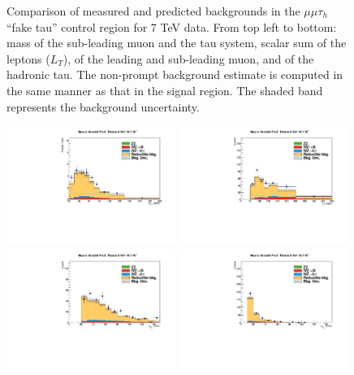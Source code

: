 \begin{figure}
\begin{center}
  \caption{Comparison of measured and predicted backgrounds in the $\mu\mu\tau_h$ ``fake tau'' control region for 7 TeV data.
  From top left to bottom: mass of the sub-leading muon and the tau system, scalar sum of the leptons \pT ($L_T$), \pT of the leading and sub-leading muon, and \pT of the hadronic tau.
  The non-prompt background estimate is computed in the same manner as that in the signal region.
  The shaded band represents the background uncertainty.
  }
  \label{fig:LLT_mmt_f3_control_7TeV}
\end{center}
\end{figure}

\begin{figure}
\begin{center}
  \includegraphics[width=0.49\textwidth]{4_Analisys/pics/8TeV/plots/mmt/f3/Full/final-f3-subMass-Full.pdf}
  \includegraphics[width=0.49\textwidth]{4_Analisys/pics/8TeV/plots/mmt/f3/final-LT.pdf}\\
  \includegraphics[width=0.49\textwidth]{4_Analisys/pics/8TeV/plots/mmt/f3/Full/final-f3-m1Pt-Full.pdf}
  \includegraphics[width=0.49\textwidth]{4_Analisys/pics/8TeV/plots/mmt/f3/Full/final-f3-m2Pt-Full.pdf}\\

\end{center}
\end{figure}
